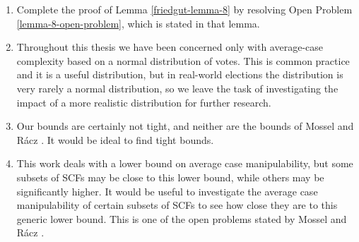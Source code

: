 	\begin{enumerate}
		\item Complete the proof of Lemma \ref{friedgut-lemma-8} by resolving Open Problem \ref{lemma-8-open-problem}, which is stated in that lemma.
		\item Throughout this thesis we have been concerned only with average-case complexity based on a normal distribution of votes. This is common practice and it is a useful distribution, but in real-world elections the distribution is very rarely a normal distribution, so we leave the task of investigating the impact of a more realistic distribution for further research.
		\item Our bounds are certainly not tight, and neither are the bounds of Mossel and R\'{a}cz \cite{mossel2011quantitative}. It would be ideal to find tight bounds.
		\item This work deals with a lower bound on average case manipulability, but some subsets of SCFs may be close to this lower bound, while others may be significantly higher. It would be useful to investigate the average case manipulability of certain subsets of SCFs to see how close they are to this generic lower bound. This is one of the open problems stated by Mossel and R\'{a}cz \cite{mossel2011quantitative}.
	\end{enumerate}
